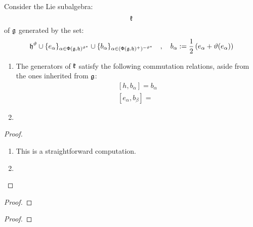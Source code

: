         \begin{proposition} \label{prop: constructing_pseudo_fixed_point_subalgebras}
            Consider the Lie subalgebra:
                $$\mathfrak{k}$$
            of $\mathfrak{g}$ generated by the set:
                \begin{equation} \label{equation: pseudo_fixed_point_subalgebra_generators}
                    \mathfrak{h}^{\vartheta} \cup \{ e_{\alpha} \}_{\alpha \in \mathsf{\Phi}(\mathfrak{g}, \mathfrak{h})^{\vartheta^*}} \cup \{ b_{\alpha} \}_{\alpha \in (\mathsf{\Phi}(\mathfrak{g}, \mathfrak{h})^+)^{-\vartheta^*}} \quad, \quad b_{\alpha} := \frac12\left( e_{\alpha} + \vartheta(e_{\alpha}) \right)
                \end{equation}
                
            \begin{enumerate}
                \item The generators of $\mathfrak{k}$ satisfy the following commutation relations, aside from the ones inherited from $\mathfrak{g}$:
                    \begin{equation} \label{equation: pseudo_fixed_point_subalgebra_relations}
                        \begin{gathered}
                            [h, b_{\alpha}] = b_{\alpha}
                            \\
                            [e_{\alpha}, b_{\beta}] = 
                        \end{gathered}
                    \end{equation}
                \item 
            \end{enumerate}
        \end{proposition}
            \begin{proof}
                \begin{enumerate}
                    \item This is a straightforward computation.
                    \item 
                \end{enumerate}
            \end{proof}
        \begin{corollary} \label{coro: pseudo_iwasawa_decompositions}
            
        \end{corollary}
            \begin{proof}
                
            \end{proof}
        \begin{corollary} \label{coro: adjoint_actions_of_pseudo_fixed_point_subalgebras}
        \end{corollary}
            \begin{proof}
                
            \end{proof}

